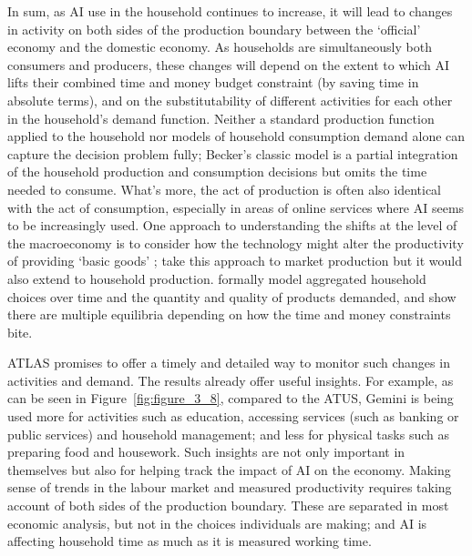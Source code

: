 \documentclass[11pt,a4paper]{article}
\begin{document}
In sum, as AI use in the household continues to increase, it will lead to changes in activity on both sides of the production boundary between the `official' economy and the domestic economy. As households are simultaneously both consumers and producers, these changes will depend on the extent to which AI lifts their combined time and money budget constraint (by saving time in absolute terms), and on the substitutability of different activities for each other in the household’s demand function. Neither a standard production function applied to the household nor models of household consumption demand alone can capture the decision problem fully; Becker’s classic \citep{becker1965} model is a partial integration of the household production and consumption decisions but omits the time needed to consume. What’s more, the act of production is often also identical with the act of consumption, especially in areas of online services where AI seems to be increasingly used. One approach to understanding the shifts at the level of the macroeconomy is to consider how the technology might alter the productivity of providing `basic goods' \citep{RePEc:ucp:jpolec:v:74:y:1966:p:132}; \citet{Hulten2022} take this approach to market production but it would also extend to household production. \citet{Fellner2015} formally model aggregated household choices over time and the quantity and quality of products demanded, and show there are multiple equilibria depending on how the time and money constraints bite.

ATLAS promises to offer a timely and detailed way to monitor such changes in activities and demand. The results already offer useful insights. For example, as can be seen in Figure~\ref{fig:figure_3_8}, compared to the ATUS, Gemini is being used more for activities such as education, accessing services (such as banking or public services) and household management; and less for physical tasks such as preparing food and housework. Such insights are not only important in themselves but also for helping track the impact of AI on the economy. Making sense of trends in the labour market and measured productivity requires taking account of both sides of the production boundary. These are separated in most economic analysis, but not in the choices individuals are making; and AI is affecting household time as much as it is measured working time.
\end{document}
